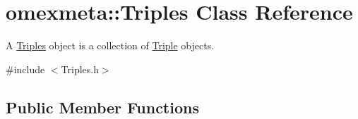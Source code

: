 \hypertarget{classomexmeta_1_1Triples}{}\section{omexmeta\+:\+:Triples Class Reference}
\label{classomexmeta_1_1Triples}


A \hyperlink{classomexmeta_1_1Triples}{Triples} object is a collection of \hyperlink{classomexmeta_1_1Triple}{Triple} objects.  




{\ttfamily \#include $<$Triples.\+h$>$}

\subsection*{Public Member Functions}

